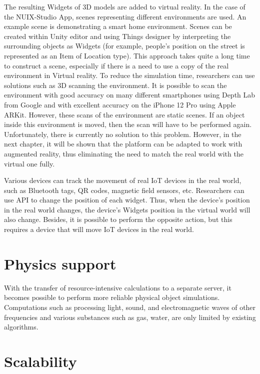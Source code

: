 The resulting Widgets of 3D models are added to virtual reality. In the case of the NUIX-Studio App, scenes representing different environments are used. An example scene is demonstrating a smart home environment. Scenes can be created within Unity editor and using Things designer by interpreting the surrounding objects as Widgets (for example, people's position on the street is represented as an Item of Location type). This approach takes quite a long time to construct a scene, especially if there is a need to use a copy of the real environment in Virtual reality. To reduce the simulation time, researchers can use solutions such as 3D scanning the environment. It is possible to scan the environment with good accuracy on many different smartphones using Depth Lab from Google and with excellent accuracy on the iPhone 12 Pro using Apple ARKit. However, these scans of the environment are static scenes. If an object inside this environment is moved, then the scan will have to be performed again. Unfortunately, there is currently no solution to this problem. However, in the next chapter, it will be shown that the platform can be adapted to work with augmented reality, thus eliminating the need to match the real world with the virtual one fully.

Various devices can track the movement of real IoT devices in the real world, such as Bluetooth tags, QR codes, magnetic field sensors, etc. Researchers can use API to change the position of each widget. Thus, when the device's position in the real world changes, the device's Widgets position in the virtual world will also change. Besides, it is possible to perform the opposite action, but this requires a device that will move IoT devices in the real world.

\section{Physics support}

With the transfer of resource-intensive calculations to a separate server, it becomes possible to perform more reliable physical object simulations. Computations such as processing light, sound, and electromagnetic waves of other frequencies and various substances such as gas, water, are only limited by existing algorithms.

\section{Scalability}

